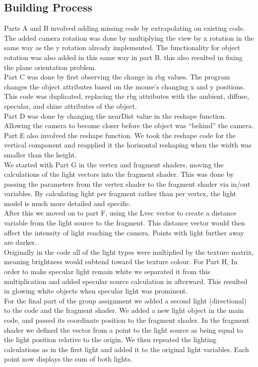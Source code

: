 \documentclass[a4paper, 11pt, titlepage]{article}
\begin{document}
\subsection*{Building Process} 
Parts A and B involved adding missing code by extrapolating on existing code. The added camera rotation was done by multiplying the view by x rotation in the same way as the y rotation already implemented. The functionality for object rotation was also added in this same way in part B. this also resulted in fixing the plane orientation problem.\\ 
Part C was done by first observing the change in rbg values. The program changes the object attributes based on the mouse's changing x and y positions. This code was duplicated, replacing the rbg attributes with the ambient, diffuse, specular, and shine attributes of the object.\\ 
Part D was done by changing the nearDist value in the reshape function. Allowing the camera to become closer before the object was “behind” the camera.\\ 
Part E also involved the reshape function. We took the reshape code for the vertical component and reapplied it the horizontal reshaping when the width was smaller than the height.\\ 
We started with Part G in the vertex and fragment shaders, moving the calculations of the light vectors into the fragment shader. This was done by passing the parameters from the vertex shader to the fragment shader via in/out variables. By calculating light per fragment rather than per vertex, the light model is much more detailed and specific.\\ 
After this we moved on to part F, using the Lvec vector to create a distance variable from the light source to the fragment. This distance vector would then affect the intensity of light reaching the camera. Points with light further away are darker.\\ 
Originally in the code all of the light types were multiplied by the texture matrix, meaning brightness would subtend toward the texture colour. For Part H, In order to make specular light remain white we separated it from this multiplication and added specular source calculation in afterward. This resulted in glowing white objects when specular light was prominent.\\ 
For the final part of the group assignment we added a second light (directional) to the code and the fragment shader. We added a new light object in the main code, and passed its coordinate position to the fragment shader. In the fragment shader we defined the vector from a point to the light source as being equal to the light position relative to the origin. We then repeated the lighting calculations as in the first light and added it to the original light variables. Each point now displays the sum of both lights. 
 
\end{document}

